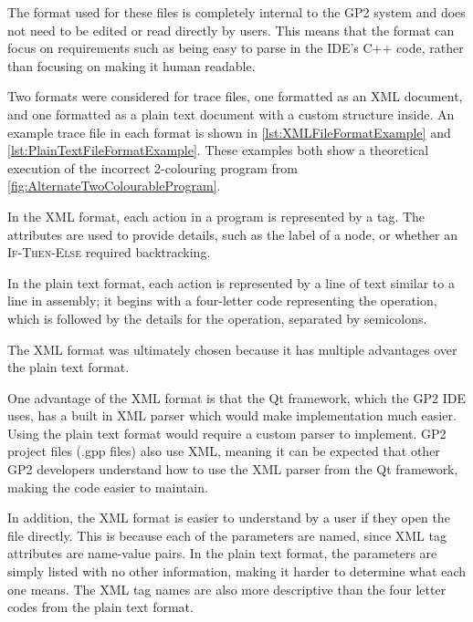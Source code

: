 \documentclass[authoryearcitations]{UoYCSproject}
\newcommand{\includecode}[4][c]{}
\begin{document}
The format used for these files is completely internal to the GP2 system and
does not need to be edited or read directly by users. This means that the format
can focus on requirements such as being easy to parse in the IDE's C++ code,
rather than focusing on making it human readable.

Two formats were considered for trace files, one formatted as an XML document,
and one formatted as a plain text document with a custom structure inside. An
example trace file in each format is shown in \autoref{lst:XMLFileFormatExample}
and \autoref{lst:PlainTextFileFormatExample}. These examples both show a
theoretical execution of the incorrect 2-colouring program from
\autoref{fig:AlternateTwoColourableProgram}.

\includecode[xml]{CodeSnippets/xmltraceexample.xml}{XML based trace file example}{lst:XMLFileFormatExample}

\includecode{CodeSnippets/plaintraceexample.txt}{Plain text trace file example}{lst:PlainTextFileFormatExample}

In the XML format, each action in a program is represented by a tag. The
attributes are used to provide details, such as the label of a node, or whether
an \textsc{If-Then-Else} required backtracking.

In the plain text format, each action is represented by a line of text similar
to a line in assembly; it begins with a four-letter code representing the
operation, which is followed by the details for the operation, separated by
semicolons.

The XML format was ultimately chosen because it has multiple advantages over the
plain text format.

One advantage of the XML format is that the Qt framework, which the GP2 IDE uses,
has a built in XML parser which would make implementation much easier. Using the
plain text format would require a custom parser to implement. GP2 project files
(.gpp files) also use XML, meaning it can be expected that other GP2 developers
understand how to use the XML parser from the Qt framework, making the code
easier to maintain.

In addition, the XML format is easier to understand by a user if they open the
file directly. This is because each of the parameters are named, since XML tag
attributes are name-value pairs. In the plain text format, the parameters are
simply listed with no other information, making it harder to determine what
each one means. The XML tag names are also more descriptive than the four letter
codes from the plain text format.
\end{document}
